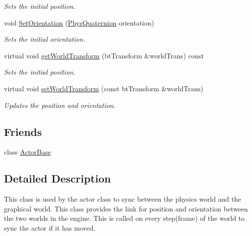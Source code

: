 \begin{DoxyCompactItemize}
\begin{DoxyCompactList}\small\item\em Sets the initial position. \item\end{DoxyCompactList}\item 
void \hyperlink{classPhysMotionState_a1f8510490f7b4dfb0c85f4ffb6823305}{SetOrientation} (\hyperlink{classPhysQuaternion}{PhysQuaternion} orientation)
\begin{DoxyCompactList}\small\item\em Sets the initial orientation. \item\end{DoxyCompactList}\item 
virtual void \hyperlink{classPhysMotionState_ad7f6fc932da90cc2a718fbe809d95287}{getWorldTransform} (btTransform \&worldTrans) const 
\begin{DoxyCompactList}\small\item\em Sets the initial position. \item\end{DoxyCompactList}\item 
virtual void \hyperlink{classPhysMotionState_a57c23b922e2c5e8af87dc1318796ec8b}{setWorldTransform} (const btTransform \&worldTrans)
\begin{DoxyCompactList}\small\item\em Updates the position and orientation. \item\end{DoxyCompactList}\end{DoxyCompactItemize}
\subsection*{Friends}
\begin{DoxyCompactItemize}
\item 
\hypertarget{classPhysMotionState_ac09063d4b0192680ba3aa0bd4003a274}{
class \hyperlink{classPhysMotionState_ac09063d4b0192680ba3aa0bd4003a274}{ActorBase}}
\label{d2/d14/classPhysMotionState_ac09063d4b0192680ba3aa0bd4003a274}

\end{DoxyCompactItemize}


\subsection{Detailed Description}
This class is used by the actor class to sync between the physics world and the graphical world. This class provides the link for position and orientation between the two worlds in the engine. This is called on every step(frame) of the world to sync the actor if it has moved. 

